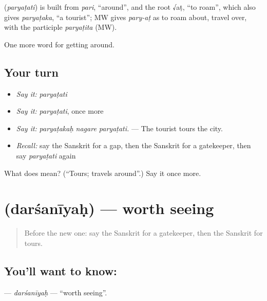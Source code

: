 \begin{cousinweb}
\textbf{} (\emph{paryaṭati}) is built from \emph{pari}, \textquotedblleft{}around\textquotedblright{}, and the root √aṭ, \textquotedblleft{}to roam\textquotedblright{}, which also gives \emph{paryaṭaka}, \textquotedblleft{}a tourist\textquotedblright{}; MW gives \emph{pary-aṭ} as to roam about, travel over, with the participle \emph{paryaṭita} (MW).
\end{cousinweb}

\begin{grammarlens}[title={What you've built}]
One more word for getting around.
\end{grammarlens}

\subsection*{Your turn}
\begin{itemize}
\raggedright
  \item \emph{Say it:} \emph{paryaṭati}
  \item \emph{Say it:} \emph{paryaṭati}, once more
  \item \emph{Say it:} \emph{paryaṭakaḥ nagare paryaṭati.} — The tourist tours the city.
  \item \emph{Recall:} say the Sanskrit for a gap, then the Sanskrit for a gatekeeper, then say \emph{paryaṭati} again
\end{itemize}

\begin{tcolorbox}[breakable,colback=teal!4,colframe=teal!35!black,title={Before you move on}]
What does  mean? (\textquotedblleft{}Tours; travels around\textquotedblright{}.) Say it once more.
\end{tcolorbox}
\section[\texorpdfstring{\sk{दर्शनीयः} (darśanīyaḥ)}{दर्शनीयः (darśanīyaḥ)}]{ (darśanīyaḥ) — worth seeing}

\label{lesson:SA-C424-darsaniyah}



\begin{quote}
Before the new one: say the Sanskrit for a gatekeeper, then the Sanskrit for tours.
\end{quote}

\subsection*{You'll want to know: }
\textbf{} — \emph{darśanīyaḥ} — \textquotedblleft{}worth seeing\textquotedblright{}.

